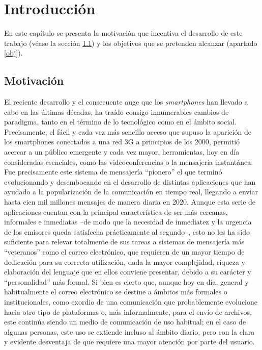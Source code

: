 \chapter{Introducción}
\label{cap:introduccion}



En este capítulo se presenta la motivación que incentiva el desarrollo de este trabajo (véase la sección \ref{motivacion}) y los objetivos que se pretenden alcanzar (apartado \ref{obj}).

\section{Motivación}\label{motivacion}
El reciente desarrollo y el consecuente auge que los \textit{smartphones} han llevado a cabo en las últimas décadas, ha traído consigo innumerables cambios de paradigma, tanto en el término de lo tecnológico como en el ámbito social. Precisamente, el fácil y cada vez más sencillo acceso que supuso la aparición de los smartphones conectados a una red 3G a principios de los 2000, permitió acercar a un público emergente y cada vez mayor, herramientas, hoy en día consideradas esenciales, como las videoconferencias o la mensajería instantánea. Fue precisamente este sistema de mensajería ``pionero'' el que terminó evolucionando y desembocando en el desarrollo de distintas aplicaciones que han ayudado a la popularización de la comunicación en tiempo real, llegando a enviar hasta cien mil millones mensajes de manera diaria en 2020. Aunque esta serie de aplicaciones cuentan con la principal característica de ser más cercanas, informales e inmediatas –de modo que la necesidad de inmediatez y la urgencia de los emisores queda satisfecha prácticamente al segundo–, esto no les ha sido suficiente para relevar totalmente de sus tareas a sistemas de mensajería más ``veteranos'' como el correo electrónico, que requieren de un mayor tiempo de dedicación para su correcta utilización, dada la mayor complejidad, riqueza y elaboración del lenguaje que en ellos conviene presentar, debido a su carácter y ``personalidad'' más formal. Si bien es cierto que, aunque hoy en día, general y habitualmente el correo electrónico se destine a ámbitos más formales o institucionales, como exordio de una comunicación que probablemente evolucione hacia otro tipo de plataformas o, más informalmente, para el envío de archivos, este continúa siendo un medio de comunicación de uso habitual; en el caso de algunas personas, este uso se extiende incluso al ámbito diario, pero con la clara y evidente desventaja de que requiere una mayor atención por parte del usuario.

